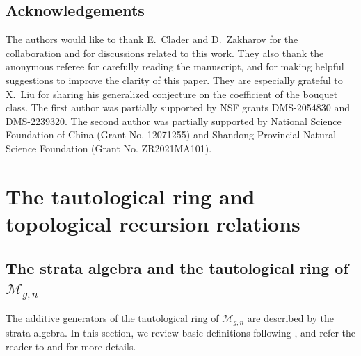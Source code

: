 \documentclass[12pt,reqno]{amsart}
\theoremstyle{plain}
\theoremstyle{definition}
\theoremstyle{remark}
\begin{document}
\subsection*{Acknowledgements}

The authors would like to thank E.~Clader and D.~Zakharov for the collaboration \cite{clader2023topological} and for discussions related to this work.
They also thank the anonymous referee for carefully reading the manuscript, and for making helpful suggestions to improve the clarity of this paper.
They are especially grateful to X.~Liu for sharing his generalized conjecture on the coefficient of the bouquet class.
The first author was partially supported by NSF grants DMS-2054830 and DMS-2239320.
The second author was partially supported by  National
Science Foundation of China (Grant No. 12071255) and Shandong Provincial Natural Science Foundation
(Grant No. ZR2021MA101).


\section{The tautological ring and topological recursion relations}
\label{sec:preliminaries}


\subsection{The strata algebra and the tautological ring of $\overline{\mathcal{M}}_{g,n}$}
\label{sec:strata}

The additive generators of the tautological ring
of $\overline{\mathcal{M}}_{g,n}$ are described by the strata algebra.
In this section, we review basic definitions following \cite[\S 2.1]{clader2023topological}, and refer the reader to \cite{graber2003constructions} and \cite{pandharipande2015relations} for more details.
\end{document}
